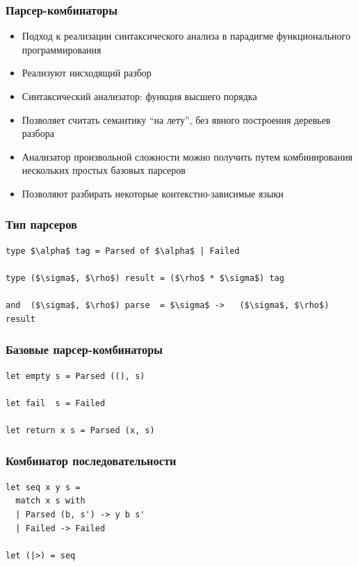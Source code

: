 \documentclass{beamer}
\begin{document}
\begin{frame}
  \transwipe[direction=90]
  \frametitle{Парсер-комбинаторы}  
  \begin{itemize}
  \item Подход к реализации синтаксического анализа в парадигме функционального программирования
  \item Реализуют нисходящий разбор
  \item Синтаксический анализатор: функция высшего порядка
  \item Позволяет считать семантику ``на лету'', без явного построения деревьев разбора
  \item Анализатор произвольной сложности можно получить путем комбинирования нескольких простых базовых парсеров
  \item Позволяют разбирать некоторые контекстно-зависимые языки
  \end{itemize}
\end{frame}

\begin{frame}[containsverbatim]
  \transwipe[direction=90]
  \frametitle{Тип парсеров}
  
\begin{lstlisting}[frame=single]  
type $\alpha$ tag = Parsed of $\alpha$ | Failed

type ($\sigma$, $\rho$) result = ($\rho$ * $\sigma$) tag

and  ($\sigma$, $\rho$) parse  = $\sigma$ ->   ($\sigma$, $\rho$) result
\end{lstlisting}
\end{frame}


\begin{frame}[fragile]
  \transwipe[direction=90]
  \frametitle{Базовые парсер-комбинаторы}  
\begin{lstlisting}[frame=single]  
let empty s = Parsed ((), s)

let fail  s = Failed 

let return x s = Parsed (x, s)
\end{lstlisting}
\end{frame}

\begin{frame}[fragile]
  \transwipe[direction=90]
  \frametitle{Комбинатор последовательности}  
\begin{lstlisting}[frame=single]  
let seq x y s =
  match x s with
  | Parsed (b, s') -> y b s'
  | Failed -> Failed

let (|>) = seq
\end{lstlisting}
\end{frame}
\end{document}
